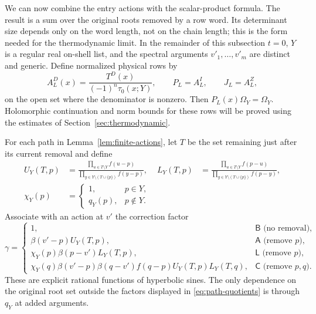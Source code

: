 We can now combine the entry actions with the scalar-product formula.
The result is a sum over the original roots removed by a row word.
Its determinant size depends only on the word length, not on the chain
length; this is the form needed for the thermodynamic limit.  In the remainder of this subsection $t=0$, $Y$ is a
regular real on-shell list, and the spectral arguments $v'_1,\ldots,v'_m$
are distinct and generic.  Define normalized physical rows by
\begin{equation}\label{eq:normalized-finite-row}
 A_L^D(x)=\frac{T^D(x)}{(-1)^n\tau_0(x;Y)},\qquad
 P_L=A_L^I,\qquad J_L=A_L^Z,
\end{equation}
on the open set where the denominator is nonzero.  Then
$P_L(x)\Omega_Y=\Omega_Y$.  Holomorphic continuation and norm bounds
for these rows will be proved using the estimates of
Section~\ref{sec:thermodynamic}.

For each path in Lemma~\ref{lem:finite-actions}, let $T$ be the set
remaining just after its current removal and define
\begin{align}
 U_Y(T,p)&=
  \frac{\prod_{u\in T\setminus Y}f(u-p)}
       {\prod_{y\in Y\setminus(T\cup\{p\})}f(y-p)},&
 L_Y(T,p)&=
  \frac{\prod_{u\in T\setminus Y}f(p-u)}
       {\prod_{y\in Y\setminus(T\cup\{p\})}f(p-y)},
 \label{eq:path-quotients}\\
 \chi_Y(p)&=
  \begin{cases}1,&p\in Y,\\q_Y(p),&p\notin Y.\end{cases}
 \label{eq:path-lower-factor}
\end{align}
Associate with an action at $v'$ the correction factor
\begin{equation}\label{eq:path-correction}
 \gamma=
 \begin{cases}
  1,&\mathsf B\text{ (no removal)},\\
  \beta(v'-p)U_Y(T,p),&\mathsf A\text{ (remove }p),\\
  \chi_Y(p)\beta(p-v')L_Y(T,p),&\mathsf L\text{ (remove }p),\\
  \chi_Y(q)\beta(v'-p)\beta(q-v')f(q-p)
        U_Y(T,p)L_Y(T,q),&\mathsf C\text{ (remove }p,q).
 \end{cases}
\end{equation}
These are explicit rational functions of hyperbolic sines.  The only
dependence on the original root set outside the factors displayed in
\eqref{eq:path-quotients} is through $q_Y$ at added arguments.

